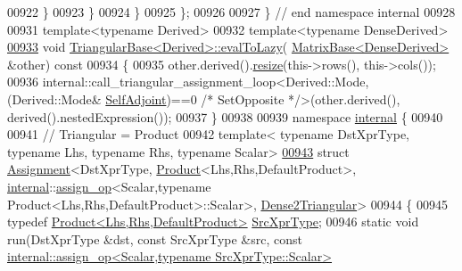 \begin{DoxyCode}
00922       \}
00923     \}
00924   \}
00925 \};
00926 
00927 \} \textcolor{comment}{// end namespace internal}
00928 
00931 \textcolor{keyword}{template}<\textcolor{keyword}{typename} Derived>
00932 \textcolor{keyword}{template}<\textcolor{keyword}{typename} DenseDerived>
\hyperlink{group___core___module_ab8db3e55eee50cdc56650b3498e235eb}{00933} \textcolor{keywordtype}{void} \hyperlink{group___core___module_class_eigen_1_1_triangular_base}{TriangularBase<Derived>::evalToLazy}(
      \hyperlink{group___core___module_class_eigen_1_1_matrix_base}{MatrixBase<DenseDerived>} &other)\textcolor{keyword}{ const}
00934 \textcolor{keyword}{}\{
00935   other.derived().\hyperlink{group___core___module_a13027a493a68a13496610caf3d81bd3e}{resize}(this->rows(), this->cols());
00936   internal::call\_triangular\_assignment\_loop<Derived::Mode,(Derived::Mode&
      \hyperlink{group__enums_gga39e3366ff5554d731e7dc8bb642f83cda2491fc6765056421f504eb7e16083e8f}{SelfAdjoint})==0 \textcolor{comment}{/* SetOpposite */}>(other.derived(), derived().nestedExpression());
00937 \}
00938 
00939 \textcolor{keyword}{namespace }\hyperlink{namespaceinternal}{internal} \{
00940   
00941 \textcolor{comment}{// Triangular = Product}
00942 \textcolor{keyword}{template}< \textcolor{keyword}{typename} DstXprType, \textcolor{keyword}{typename} Lhs, \textcolor{keyword}{typename} Rhs, \textcolor{keyword}{typename} Scalar>
\hyperlink{struct_eigen_1_1internal_1_1_assignment_3_01_dst_xpr_type_00_01_product_3_01_lhs_00_01_rhs_00_0193a1d113168a246bb6cb34430a4d0595}{00943} \textcolor{keyword}{struct }\hyperlink{struct_eigen_1_1internal_1_1_assignment}{Assignment}<DstXprType, \hyperlink{group___core___module_class_eigen_1_1_product}{Product}<Lhs,Rhs,DefaultProduct>, 
      \hyperlink{namespaceinternal}{internal}::\hyperlink{struct_eigen_1_1internal_1_1assign__op}{assign\_op}<Scalar,typename Product<Lhs,Rhs,DefaultProduct>::Scalar>, 
      \hyperlink{struct_eigen_1_1internal_1_1_dense2_triangular}{Dense2Triangular}>
00944 \{
00945   \textcolor{keyword}{typedef} \hyperlink{group___core___module_class_eigen_1_1_product}{Product<Lhs,Rhs,DefaultProduct>} 
      \hyperlink{group___core___module_class_eigen_1_1_product}{SrcXprType};
00946   \textcolor{keyword}{static} \textcolor{keywordtype}{void} run(DstXprType &dst, \textcolor{keyword}{const} SrcXprType &src, \textcolor{keyword}{const} 
      \hyperlink{struct_eigen_1_1internal_1_1assign__op}{internal::assign\_op<Scalar,typename SrcXprType::Scalar>}

\end{DoxyCode}
